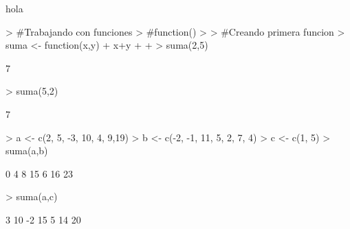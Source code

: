 \documentclass{article}
\begin{document}

hola
\begin{Schunk}
\begin{Sinput}
> #Trabajando con funciones 
> #function(){}
> 
> #Creando primera funcion 
> suma <- function(x,y){
+   x+y
+   
+ }
> suma(2,5)
\end{Sinput}
\begin{Soutput}
[1] 7
\end{Soutput}
\begin{Sinput}
> suma(5,2)
\end{Sinput}
\begin{Soutput}
[1] 7
\end{Soutput}
\begin{Sinput}
> a <- c(2, 5, -3, 10, 4, 9,19)
> b <- c(-2, -1, 11, 5, 2, 7, 4)
> c <- c(1, 5)
> suma(a,b)
\end{Sinput}
\begin{Soutput}
[1]  0  4  8 15  6 16 23
\end{Soutput}
\begin{Sinput}
> suma(a,c)
\end{Sinput}
\begin{Soutput}
[1]  3 10 -2 15  5 14 20
\end{Soutput}
\end{Schunk}
\end{document}
